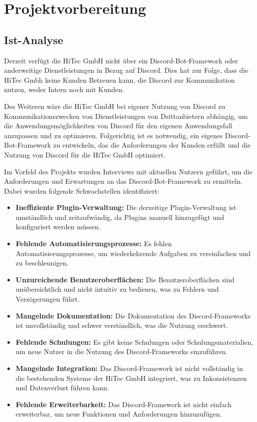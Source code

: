 
\section{Projektvorbereitung}\label{projektvorbereitung}

\subsection{Ist-Analyse}\label{ist-analyse}

Derzeit verfügt die HiTec GmbH nicht über ein Discord-Bot-Framework oder anderweitige Dienstleistungen in Bezug auf Discord. Dies hat zur Folge, dass die HiTec Gmbh keine Kunden Betreuen kann, die Discord zur Kommunikation nutzen, weder Intern noch mit Kunden.

Des Weiteren wäre die HiTec GmbH bei eigener Nutzung von Discord zu Kommunikationszwecken von Dienstleistungen von Drittanbietern abhängig, um die Anwendungsmöglichkeiten von Discord für den eigenen Anwendungsfall anzupassen und zu optimieren. Folgerichtig ist es notwendig, ein eigenes Discord-Bot-Framework zu entwickeln, das die Anforderungen der Kunden erfüllt und die Nutzung von Discord für die HiTec GmbH optimiert.

Im Vorfeld des Projekts wurden Interviews mit aktuellen Nutzern geführt, um die Anforderungen und Erwartungen an das Discord-Bot-Framework zu ermitteln. Dabei wurden folgende Schwachstellen identifiziert:

\begin{itemize}
    \item \textbf{Ineffiziente Plugin-Verwaltung:} Die derzeitige Plugin-Verwaltung ist umständlich und zeitaufwändig, da Plugins manuell hinzugefügt und konfiguriert werden müssen.
    \item \textbf{Fehlende Automatisierungsprozesse:} Es fehlen Automatisierungsprozesse, um wiederkehrende Aufgaben zu vereinfachen und zu beschleunigen.
    \item \textbf{Unzureichende Benutzeroberflächen:} Die Benutzeroberflächen sind unübersichtlich und nicht intuitiv zu bedienen, was zu Fehlern und Verzögerungen führt.
    \item \textbf{Mangelnde Dokumentation:} Die Dokumentation des Discord-Frameworks ist unvollständig und schwer verständlich, was die Nutzung erschwert.
    \item \textbf{Fehlende Schulungen:} Es gibt keine Schulungen oder Schulungsmaterialien, um neue Nutzer in die Nutzung des Discord-Frameworks einzuführen.
    \item \textbf{Mangelnde Integration:} Das Discord-Framework ist nicht vollständig in die bestehenden Systeme der HiTec GmbH integriert, was zu Inkonsistenzen und Datenverlust führen kann.
    \item \textbf{Fehlende Erweiterbarkeit:} Das Discord-Framework ist nicht einfach erweiterbar, um neue Funktionen und Anforderungen hinzuzufügen.
\end{itemize}

